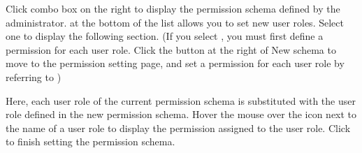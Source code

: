 \documentclass[letterpaper,10pt,english]{sphinxmanual}
\begin{document}
Click  combo box on the right to display the permission schema defined by the administrator.  at the bottom of the list allows you to set new user roles. Select one to display the following section. (If you select , you must first define a permission for each user role. Click the  button at the right of New schema to move to the permission setting page, and set a permission for each user role by referring to {\hyperref[\detokenize{discovery/part03/shared_workspace:permission-schema-view}]{}})
\begin{quote}

\begin{figure}[H]
\centering

\noindent{}
\end{figure}
\end{quote}

Here, each user role of the current permission schema is substituted with the user role defined in the new permission schema. Hover the mouse over the  icon next to the name of a user role to display the permission assigned to the user role. Click  to finish setting the permission schema.
\end{document}
